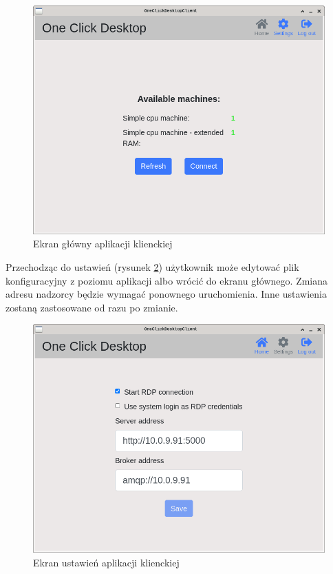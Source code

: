 \documentclass[../opis-rozwiazania.tex]{subfiles}
\begin{document}
\begin{figure}[ht!]
  \centering
  \includegraphics[width=\textwidth]{resources/client_home.png}
  \caption{Ekran główny aplikacji klienckiej}
  \label{figure:system_interaction.client.home}
\end{figure}

Przechodząc do ustawień (rysunek \ref{figure:system_interaction.client.settings}) użytkownik może edytować plik konfiguracyjny z poziomu aplikacji albo wrócić do ekranu głównego.
Zmiana adresu nadzorcy będzie wymagać ponownego uruchomienia.
Inne ustawienia zostaną zastosowane od razu po zmianie.

\begin{figure}[ht!]
  \centering
  \includegraphics[width=\textwidth]{resources/client_settings.png}
  \caption{Ekran ustawień aplikacji klienckiej}
  \label{figure:system_interaction.client.settings}
\end{figure}
\end{document}
